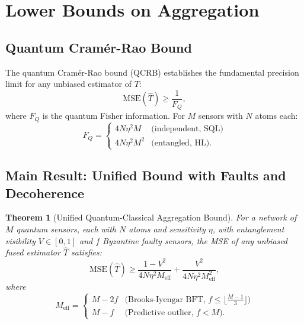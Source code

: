 \documentclass[twocolumn,11pt]{article}
\newtheorem{theorem}{Theorem}
\begin{document}
\section{Lower Bounds on Aggregation}
\label{sec:bounds}

\subsection{Quantum Cram\'{e}r-Rao Bound}

The quantum Cram\'{e}r-Rao bound (QCRB) establishes the
fundamental precision limit for any unbiased estimator of
$T$:
\begin{equation}
    \mathrm{MSE}(\hat{T}) \geq \frac{1}{F_Q},
    \label{eq:qcrb}
\end{equation}
where $F_Q$ is the quantum Fisher information.
For $M$ sensors with $N$ atoms each:
\begin{equation}
    F_Q = \begin{cases}
        4N\eta^2 M & \text{(independent, SQL)} \\
        4N\eta^2 M^2 & \text{(entangled, HL)}.
    \end{cases}
    \label{eq:qfi}
\end{equation}

\subsection{Main Result: Unified Bound with Faults and Decoherence}

\begin{theorem}[Unified Quantum-Classical Aggregation Bound]
\label{thm:unified}
For a network of $M$ quantum sensors, each with $N$ atoms and
sensitivity $\eta$, with entanglement visibility $V \in [0,1]$
and $f$ Byzantine faulty sensors, the MSE of any unbiased fused
estimator $\hat{T}$ satisfies:
\begin{equation}
    \mathrm{MSE}(\hat{T}) \geq
    \frac{1-V^2}{4N\eta^2 M_{\mathrm{eff}}}
    + \frac{V^2}{4N\eta^2 M_{\mathrm{eff}}^2},
    \label{eq:unified}
\end{equation}
where
\begin{equation}
    M_{\mathrm{eff}} = \begin{cases}
        M - 2f & \text{(Brooks-Iyengar BFT, } f \leq \lfloor\tfrac{M-1}{3}\rfloor\text{)} \\
        M - f  & \text{(Predictive outlier, } f < M\text{)}.
    \end{cases}
    \label{eq:meff}
\end{equation}
\end{theorem}
\end{document}

